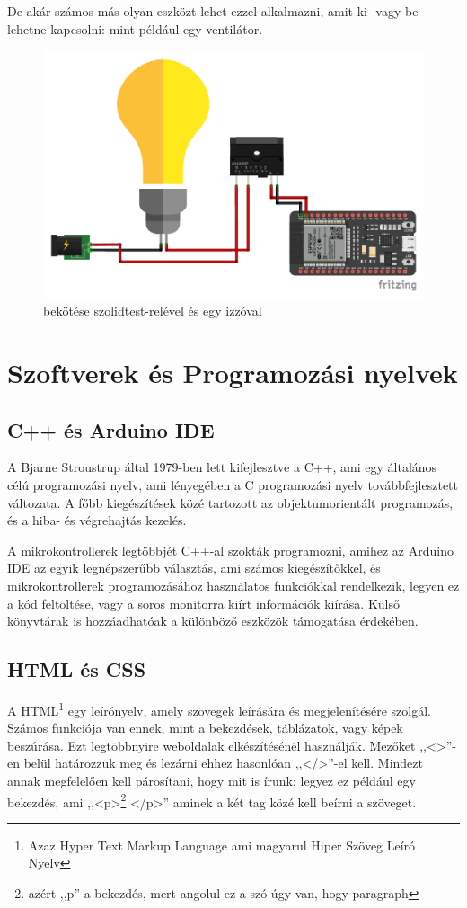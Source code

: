 \documentclass[
]{thesis-ekf}
\theoremstyle{definition}
\theoremstyle{remark}
\begin{document}
	De akár számos más olyan eszközt lehet ezzel alkalmazni, amit ki- vagy be lehetne kapcsolni: mint például egy ventilátor.
	
	\begin{figure}[ht!]
		\centering
		\includegraphics[width=16cm]{./img/ESP32 toggle schematics_bb}
		\caption{ bekötése szolidtest-relével és egy izzóval}
		\label{toggle-schematics}
	\end{figure}	
	
	\section{Szoftverek és Programozási nyelvek}
	\subsection{C++ és Arduino IDE}
	A Bjarne Stroustrup által 1979-ben lett kifejlesztve a C++, ami egy általános célú programozási nyelv, ami lényegében a C programozási nyelv továbbfejlesztett változata. A főbb kiegészítések közé tartozott az objektumorientált programozás, és a hiba- és végrehajtás kezelés.\cite{cpp}
	
	A mikrokontrollerek legtöbbjét C++-al szokták programozni, amihez az Arduino IDE az egyik legnépszerűbb választás, ami számos kiegészítőkkel, és mikrokontrollerek programozásához használatos funkciókkal rendelkezik, legyen ez a kód feltöltése, vagy a soros monitorra kiírt információk kiírása. Külső könyvtárak is hozzáadhatóak a különböző eszközök támogatása érdekében. 
	
	\subsection{HTML és CSS}
	A HTML\footnote{Azaz Hyper Text Markup Language ami magyarul Hiper Szöveg Leíró Nyelv}  egy leírónyelv, amely szövegek leírására és megjelenítésére szolgál. Számos funkciója van ennek, mint a bekezdések, táblázatok, vagy képek beszúrása. Ezt legtöbbnyire weboldalak elkészítésénél használják. Mezőket ,,<>''-en belül határozzuk meg és lezárni ehhez hasonlóan ,,</>''-el kell. Mindezt annak megfelelően kell párosítani, hogy mit is írunk: legyez ez például egy bekezdés, ami ,,<p>\footnote{azért ,,p'' a bekezdés, mert angolul ez a szó úgy van, hogy paragraph} </p>'' aminek a két tag közé kell beírni a szöveget.
	
\end{document}
